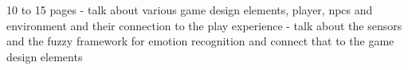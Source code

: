 10 to 15 pages
- talk about various game design elements, player, npcs and environment 
and their connection to the play experience
- talk about the sensors and the fuzzy framework for emotion recognition
and connect that to the game design elements
